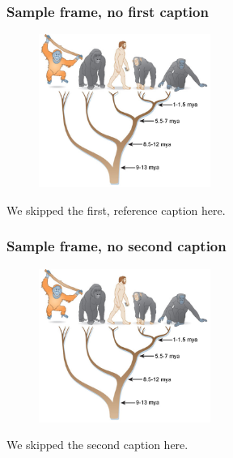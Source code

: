 \begin{frame}\frametitle{Sample frame, no first caption}
  \begin{figure}[h!]
    \includegraphics[height=5cm]{figures/TS-Apes.jpg}
    \def\figurename{}
  \end{figure}
  We skipped the first, reference caption here.
\end{frame}

\begin{frame}\frametitle{Sample frame, no second caption}
  \begin{figure}[h!]
    \includegraphics[height=5cm]{figures/TS-Apes.jpg}
  \end{figure}
  We skipped the second caption here.
\end{frame}


